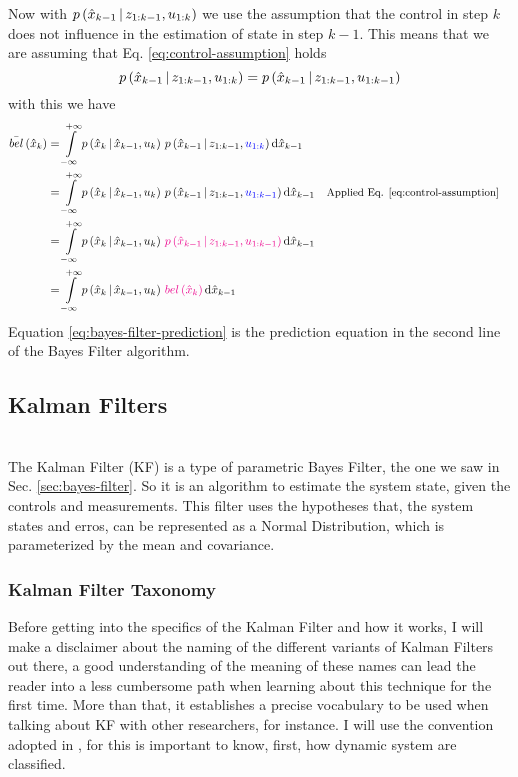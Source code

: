 \documentclass[12pt]{article}
\begin{document}
Now with $p\left(\hat{x}_{k-1} \,|\, z_{1:k-1}, u_{1:k}\right)$ we use the assumption that the control in step $k$ does not influence in the estimation of state in step $k-1$. This means that we are assuming that Eq. \ref{eq:control-assumption} holds
\begin{equation}
    \pr{\hat{x}_{k-1} \given z_{1:k-1}, u_{1:k}} = \pr{\hat{x}_{k-1} \given z_{1:k-1}, u_{1:k-1}}
    \label{eq:control-assumption}
\end{equation}
with this we have
\begin{equation}
\begin{aligned}
    \bar{\bel}\parentheses{\hat{x}_k} &= \Int[\hat{x}_{k-1}]{-\infty}{+\infty}{\pr{\hat{x}_k \given \hat{x}_{k-1}, u_k} \, \pr{\hat{x}_{k-1} \given z_{1:k-1}, \blue{u_{1:k}}} }\\
    &= \Int[\hat{x}_{k-1}]{-\infty}{+\infty}{\pr{\hat{x}_k \given \hat{x}_{k-1}, u_k} \, \pr{\hat{x}_{k-1} \given z_{1:k-1}, \blue{u_{1:k-1}}} } && \small\text{Applied Eq. \ref{eq:control-assumption}}\\
    &= \Int[\hat{x}_{k-1}]{-\infty}{+\infty}{\pr{\hat{x}_k \given \hat{x}_{k-1}, u_k} \, \magenta{\pr{\hat{x}_{k-1} \given z_{1:k-1}, u_{1:k-1}}} } \\
    &= \Int[\hat{x}_{k-1}]{-\infty}{+\infty}{\pr{\hat{x}_k \given \hat{x}_{k-1}, u_k} \, \magenta{\belF{\hat{x}_k}} }
\end{aligned}
\label{eq:bayes-filter-prediction}
\end{equation}
Equation \ref{eq:bayes-filter-prediction} is the prediction equation in the second line of the Bayes Filter algorithm.


\subsection{Kalman Filters}
\\
The Kalman Filter (KF) is a type of parametric Bayes Filter, the one we saw in Sec. \ref{sec:bayes-filter}. So it is an algorithm to estimate the system state, given the controls and measurements. This filter uses the hypotheses that, the system states and erros, can be represented as a Normal Distribution, which is parameterized by the mean and covariance. \\

\subsubsection{Kalman Filter Taxonomy}
Before getting into the specifics of the Kalman Filter and how it works, I will make a disclaimer about the naming of the different variants of Kalman Filters out there, a good understanding of the meaning of these names can lead the reader into a less cumbersome path when learning about this technique for the first time. More than that, it establishes a precise vocabulary to be used when talking about KF with other researchers, for instance. I will use the convention adopted in \cite[p. ~151]{lewis2017optimal}, for this is important to know, first, how dynamic system are classified. 
\end{document}
